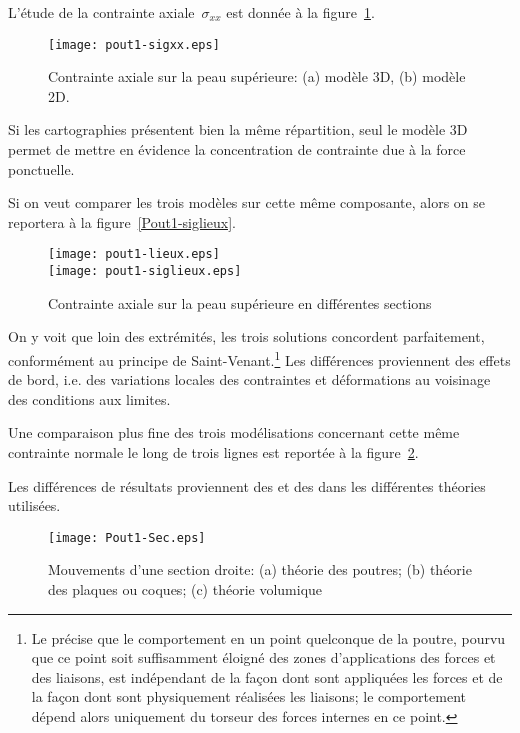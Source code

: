 \medskip
L'étude de la contrainte axiale~$\sigma_{xx}$ est donnée à la figure~\ref{Pout1-sigxx}.
\begin{figure}[ht]
\centering
\texttt{[image: pout1-sigxx.eps]}
\caption{\label{Pout1-sigxx} Contrainte axiale sur la peau supérieure: (a) modèle 3D,
(b) modèle 2D.}
\end{figure}
Si les cartographies présentent bien la même répartition, seul le modèle 3D permet de mettre en évidence la concentration de contrainte due à la force ponctuelle.

\medskip
Si on veut comparer les trois modèles sur cette même composante, alors on se reportera à la figure~\ref{Pout1-siglieux}.
\begin{figure}[ht]
\centering
\texttt{[image: pout1-lieux.eps]}\\
\texttt{[image: pout1-siglieux.eps]}
\caption{Contrainte axiale sur la peau supérieure en différentes sections}
\end{figure}\label{Pout1-siglieux}
On y voit que loin des extrémités, les trois solutions concordent parfaitement, conformément au principe de Saint-Venant.\footnote{Le  précise que le comportement en un point quelconque de la poutre, pourvu que ce point soit suffisamment éloigné des zones d'applications des forces et des liaisons, est indépendant de la façon dont sont appliquées les forces et de la façon dont sont physiquement réalisées les liaisons; le comportement dépend alors uniquement du torseur des forces internes en ce point.} Les différences proviennent des effets de bord, i.e. des variations locales des contraintes et déformations au voisinage des conditions aux limites.

Une comparaison plus fine des trois modélisations concernant cette même contrainte normale le long de trois lignes est reportée à la figure~\ref{Pout1-sec}.

\medskip
Les différences de résultats proviennent des  et des  dans les différentes théories utilisées.
\begin{figure}[ht]
\centering
\texttt{[image: Pout1-Sec.eps]}
\caption{Mouvements d'une section droite: (a) théorie des poutres;
(b) théorie des plaques ou coques; (c) théorie volumique}\label{Pout1-sec}
\end{figure}

